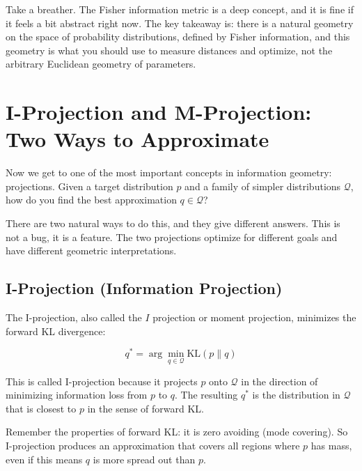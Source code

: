 \vspace{1.5em}

Take a breather. The Fisher information metric is a deep concept, and it is fine if it feels a bit abstract right now. The key takeaway is: there is a natural geometry on the space of probability distributions, defined by Fisher information, and this geometry is what you should use to measure distances and optimize, not the arbitrary Euclidean geometry of parameters.

\vspace{2em}

\section{I-Projection and M-Projection: Two Ways to Approximate}

Now we get to one of the most important concepts in information geometry: projections. Given a target distribution $p$ and a family of simpler distributions $\mathcal{Q}$, how do you find the best approximation $q \in \mathcal{Q}$?

There are two natural ways to do this, and they give different answers. This is not a bug, it is a feature. The two projections optimize for different goals and have different geometric interpretations.

\vspace{1.5em}

\subsection{I-Projection (Information Projection)}

The I-projection, also called the $I$ projection or moment projection, minimizes the forward KL divergence:

\begin{equation}
q^* = \arg\min_{q \in \mathcal{Q}} \text{KL}(p \| q)
\end{equation}

This is called I-projection because it projects $p$ onto $\mathcal{Q}$ in the direction of minimizing information loss from $p$ to $q$. The resulting $q^*$ is the distribution in $\mathcal{Q}$ that is closest to $p$ in the sense of forward KL.

\vspace{1em}

Remember the properties of forward KL: it is zero avoiding (mode covering). So I-projection produces an approximation that covers all regions where $p$ has mass, even if this means $q$ is more spread out than $p$.

